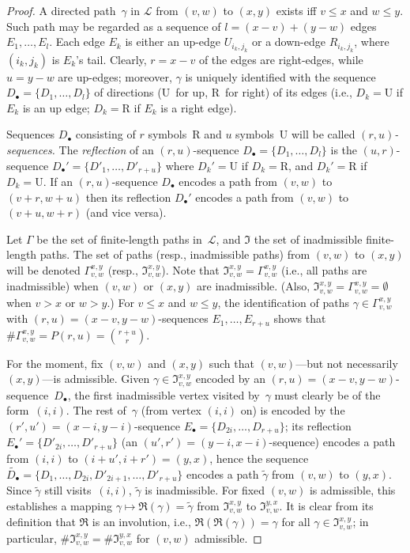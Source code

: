 \documentclass[11pt,letterpaper]{amsart}
\theoremstyle{plain}
\theoremstyle{definition}
\newcommand{\Db}{\ensuremath{D_{\bullet}}}
\newcommand{\Eb}{\ensuremath{E_{\bullet}}}
\begin{document}
\begin{proof}
A directed path~$\gamma$ in $\mathcal{L}$ from $(v,w)$ to $(x,y)$ exists iff $v\le x$ and $w\le y$.
Such path may be regarded as a sequence of $l = (x-v)+(y-w)$ edges $E_1,\dots,E_l$.
Each edge $E_k$ is either an up-edge $U_{i_k,j_k}$ or a down-edge $R_{i_k,j_k}$, where $(i_k,j_k)$ is $E_k$'s tail.
Clearly, $r=x-v$ of the edges are right-edges, while $u=y-w$ are up-edges;
moreover, $\gamma$ is uniquely identified with the sequence $\Db = \{D_1,\dots,D_l\}$ of directions ($\mathrm{U}$~for up, $\mathrm{R}$~for right) of its edges (i.e., $D_k=\mathrm{U}$ if $E_k$ is an up edge; $D_k=\mathrm{R}$ if $E_k$ is a right edge).

Sequences $\Db$ consisting of $r$ symbols~$\mathrm{R}$ and $u$ symbols~$\mathrm{U}$ will be called \emph{$(r,u)$-sequences.}
The \emph{reflection} of an $(r,u)$-sequence $\Db = \{D_1,\dots,D_l\}$  is the $(u,r)$-sequence $\Db' = \{D'_1,\dots,D'_{r+u}\}$ where $D_k' = \mathrm{U}$ if $D_k = \mathrm{R}$, and $D_k' = \mathrm{R}$ if $D_k = \mathrm{U}$.
If an $(r,u)$-sequence $\Db$ encodes a path from $(v,w)$ to $(v+r,w+u)$ then its reflection $\Db'$ encodes a path from $(v,w)$ to $(v+u,w+r)$ (and vice versa).

Let $\Gamma$ be the set of finite-length paths in~$\mathcal{L}$, and $\mathfrak{I}$ the set of inadmissible finite-length paths.
The set of paths (resp., inadmissible paths) from $(v,w)$ to $(x,y)$ will be denoted $\Gamma_{v,w}^{x,y}$ (resp., $\mathfrak{I}_{v,w}^{x,y}$).
Note that $\mathfrak{I}_{v,w}^{x,y} = \Gamma_{v,w}^{x,y}$ (i.e., all paths are inadmissible) when $(v,w)$ or $(x,y)$ are inadmissible.
(Also, $\mathfrak{I}_{v,w}^{x,y} = \Gamma_{v,w}^{x,y} = \emptyset$ when $v>x$ or $w>y$.)
For $v\le x$ and $w\le y$, the identification of paths $\gamma\in\Gamma_{v,w}^{x,y}$ with $(r,u) = (x-v,y-w)$-sequences $E_1,\dots,E_{r+u}$ shows that $\#\Gamma_{v,w}^{x,y} = P(r,u) = \binom{r+u}{r}$.

For the moment, fix $(v,w)$ and $(x,y)$ such that $(v,w)$---but not necessarily~$(x,y)$---is admissible.
Given $\gamma\in \mathfrak{I}_{v,w}^{x,y}$ encoded by an $(r,u) = (x-v,y-w)$-sequence~$\Db$, the first inadmissible vertex visited by~$\gamma$ must clearly be of the form~$(i,i)$. %
The rest of~$\gamma$ (from vertex $(i,i)$ on) is encoded by the $(r',u') = (x-i,y-i)$-sequence $\Eb = \{D_{2i},\dots,D_{r+u}\}$;
its reflection $\Eb'= \{D'_{2i},\dots,D'_{r+u}\}$ (an $(u',r')=(y-i,x-i)$-sequence) encodes a path from $(i,i)$ to $(i+u',i+r') = (y,x)$, hence the sequence $\widetilde{\Db} = \{D_1,\dots,D_{2i},D'_{2i+1},\dots,D'_{r+u}\}$ encodes a path $\widetilde{\gamma}$ from $(v,w)$ to $(y,x)$.
Since $\widetilde{\gamma}$ still visits~$(i,i)$, $\widetilde{\gamma}$ is inadmissible.
For fixed $(v,w)$ is admissible, this establishes a mapping $\gamma\mapsto \mathfrak{R}(\gamma) = \widetilde{\gamma}$ from $\mathfrak{I}_{v,w}^{x,y}$ to $\mathfrak{I}_{v,w}^{y,x}$. %
It is clear from its definition that $\mathfrak{R}$ is an involution, i.e., $\mathfrak{R}(\mathfrak{R}(\gamma)) = \gamma$ for all $\gamma\in \mathfrak{I}_{v,w}^{x,y}$;
in particular, $\#\mathfrak{I}_{v,w}^{x,y} = \#\mathfrak{I}_{v,w}^{y,x}$ for $(v,w)$ admissible.


\end{proof}
\end{document}

